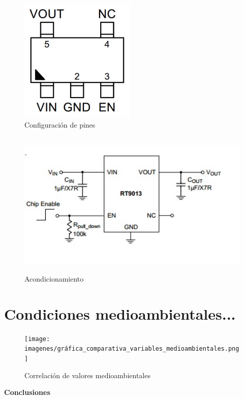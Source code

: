 \vspace{1cm}

\begin{figure}[H]
    \centering
    \includegraphics[width=5.5cm, height=6cm]{imagenes/esquematico RT9013.pdf}
    \caption{Configuración de pines}
    \label{imag:pines_RT9013}
\end{figure}

\begin{figure}[H]
    \centering
    \includegraphics[width=12cm, height=7cm]{imagenes/acondicionamiento RT9013.jpg}
    \caption{Acondicionamiento}
    \label{imag:acondicionamiento_RT9013}
\end{figure}

\newpage

\section{Condiciones medioambientales...} \label{sec: condiciones_medioambientales}


    \begin{figure}[H]
        \centering
        \texttt{[image: imagenes/gráfica\_comparativa\_variables\_medioambientales.png]}
        \caption{Correlación de valores medioambientales}
        \label{imag:grafica_condiciones_medioambientales}
    \end{figure}


        \textbf{\Large Conclusiones}\newline
